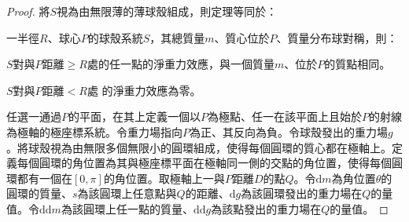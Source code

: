 \documentclass[a4paper,12pt]{article}
\begin{document}
\begin{proof}
將$S$視為由無限薄的薄球殼組成，則定理等同於：

一半徑$R$、球心$P$的球殼系統$S$，其總質量$m$、質心位於$P$、質量分布球對稱，則：
\ben
\item $S$對與$P$距離$\geq R$處的任一點的淨重力效應，與一個質量$m$、位於$P$的質點相同。
\item $S$對與$P$距離$<R$處
的淨重力效應為零。
\een

任選一通過$P$的平面，在其上定義一個以$P$為極點、任一在該平面上且始於$P$的射線為極軸的極座標系統。令重力場指向$P$為正、其反向為負。令球殼發出的重力場$g$。將球殼視為由無限多個無限小的圓環組成，使得每個圓環的質心都在極軸上。定義每個圓環的角位置為其與極座標平面在極軸同一側的交點的角位置，使得每個圓環都有一個在$[0,\pi]$的角位置。取極軸上一與$P$距離$D$的點$Q$。令$\mathrm{d}m$為角位置$\theta$的圓環的質量、$s$為該圓環上任意點與$Q$的距離、$\mathrm{d}g$為該圓環發出的重力場在$Q$的量值。令$\mathrm{d}\mathrm{d}m$為該圓環上任一點的質量、$\mathrm{d}\mathrm{d}g$為該點發出的重力場在$Q$的量值。


\end{proof}
\end{document}
